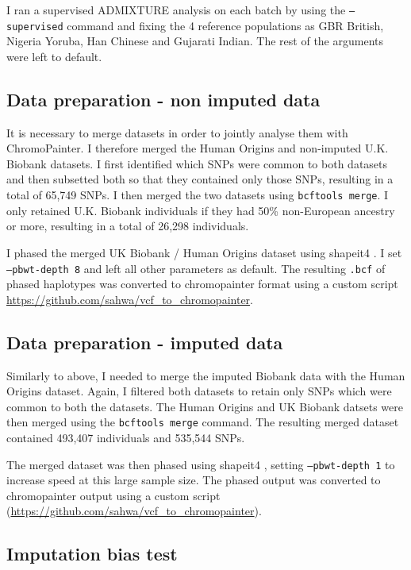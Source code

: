 I ran a supervised ADMIXTURE analysis on each batch by using the \texttt{--supervised} command and fixing the 4 reference populations as GBR British, Nigeria Yoruba, Han Chinese and Gujarati Indian. The rest of the arguments were left to default.

\subsection{Data preparation - non imputed data}

It is necessary to merge datasets in order to jointly analyse them with ChromoPainter. I therefore merged the Human Origins and non-imputed U.K. Biobank datasets. I first identified which SNPs were common to both datasets and then subsetted both so that they contained only those SNPs, resulting in a total of 65,749 SNPs. I then merged the two datasets using \texttt{bcftools merge}. I only retained U.K. Biobank individuals if they had 50\% non-European ancestry or more, resulting in a total of 26,298 individuals. 

I phased the merged UK Biobank / Human Origins dataset using shapeit4 \cite{delaneau2018integrative}. I set \texttt{--pbwt-depth 8} and left all other parameters as default. The resulting \texttt{.bcf} of phased haplotypes was converted to chromopainter format using a custom script \url{https://github.com/sahwa/vcf_to_chromopainter}.  

\subsection{Data preparation - imputed data}

Similarly to above, I needed to merge the imputed Biobank data with the Human Origins dataset. Again, I filtered both datasets to retain only SNPs which were common to both the datasets. The Human Origins and UK Biobank datsets were then merged using the \texttt{bcftools merge} command. The resulting merged dataset contained 493,407 individuals and 535,544 SNPs.

The merged dataset was then phased using shapeit4 \cite{delaneau2018integrative}, setting \texttt{--pbwt-depth 1} to increase speed at this large sample size. The phased output was converted to chromopainter output using a custom script (\url{https://github.com/sahwa/vcf_to_chromopainter}).

\subsection{Imputation bias test}

